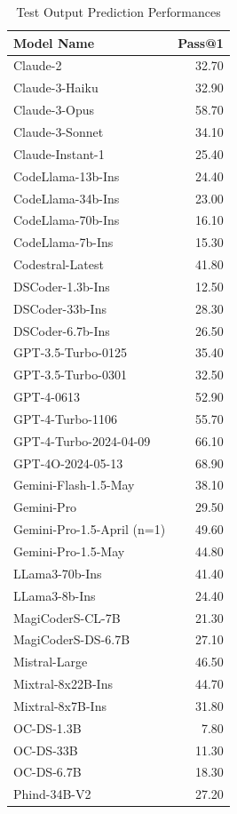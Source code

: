 \begin{table}[ht]
\centering
\begin{tabular}{lr}
    \hline
Model Name & Pass@1 \\
    \hline
Claude-2 & 32.70\\
Claude-3-Haiku & 32.90\\
Claude-3-Opus & 58.70\\
Claude-3-Sonnet & 34.10\\
Claude-Instant-1 & 25.40\\
CodeLlama-13b-Ins & 24.40\\
CodeLlama-34b-Ins & 23.00\\
CodeLlama-70b-Ins & 16.10\\
CodeLlama-7b-Ins & 15.30\\
Codestral-Latest & 41.80\\
DSCoder-1.3b-Ins & 12.50\\
DSCoder-33b-Ins & 28.30\\
DSCoder-6.7b-Ins & 26.50\\
GPT-3.5-Turbo-0125 & 35.40\\
GPT-3.5-Turbo-0301 & 32.50\\
GPT-4-0613 & 52.90\\
GPT-4-Turbo-1106 & 55.70\\
GPT-4-Turbo-2024-04-09 & 66.10\\
GPT-4O-2024-05-13 & 68.90\\
Gemini-Flash-1.5-May & 38.10\\
Gemini-Pro & 29.50\\
Gemini-Pro-1.5-April (n=1) & 49.60\\
Gemini-Pro-1.5-May & 44.80\\
LLama3-70b-Ins & 41.40\\
LLama3-8b-Ins & 24.40\\
MagiCoderS-CL-7B & 21.30\\
MagiCoderS-DS-6.7B & 27.10\\
Mistral-Large & 46.50\\
Mixtral-8x22B-Ins & 44.70\\
Mixtral-8x7B-Ins & 31.80\\
OC-DS-1.3B & 7.80\\
OC-DS-33B & 11.30\\
OC-DS-6.7B & 18.30\\
Phind-34B-V2 & 27.20\\
    \hline
\end{tabular}
\caption{Test Output Prediction Performances}
\end{table}

